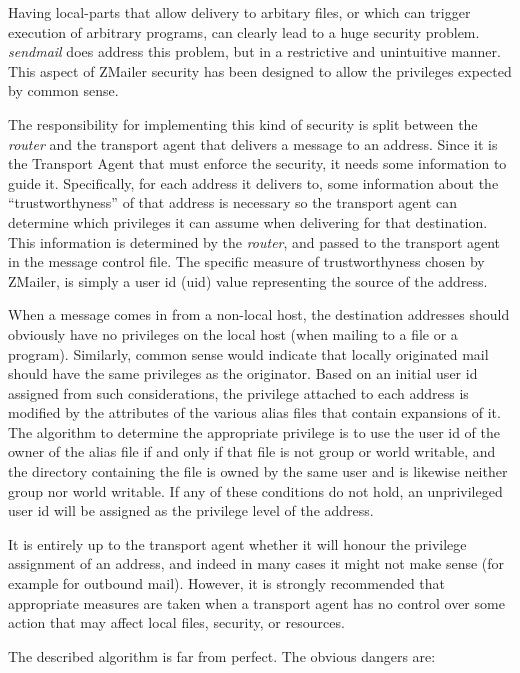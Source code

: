 Having local-parts that allow delivery to arbitary files, or which can trigger
execution of arbitrary programs, can clearly lead to a huge security
problem.  {\em sendmail\/} does address this problem, but in a restrictive and
unintuitive manner.  This aspect of ZMailer security has been designed to
allow the privileges expected by common sense.

The responsibility for implementing this kind of security is split between
the {\em router\/} and the transport agent that delivers a message to
an address.
Since it is the Transport Agent that must enforce the security, it needs
some information to guide it.  Specifically, for each address it delivers
to, some information about the ``trustworthyness'' of that address is
necessary so the transport agent can determine which privileges it can
assume when delivering for that destination.  This information is
determined by the {\em router\/}, and passed to the transport agent in the message
control file.  The specific measure of trustworthyness chosen by ZMailer, 
is simply a user id (uid) value representing the source of the address.

When a message comes in from a non-local host, the destination addresses
should obviously have no privileges on the local host (when mailing to a
file or a program).  Similarly, common sense would indicate that locally
originated mail should have the same privileges as the originator.  Based
on an initial user id assigned from such considerations, the privilege
attached to each address is modified by the attributes of the various alias
files that contain expansions of it.  The algorithm to determine the
appropriate privilege is to use the user id of the owner of the alias file
if and only if that file is not group or world writable, and the directory
containing the file is owned by the same user and is likewise neither group
nor world writable.  If any of these conditions do not hold, an
unprivileged user id will be assigned as the privilege level of the
address.



It is entirely up to the transport agent whether it will honour the
privilege assignment of an address, and indeed in many cases it might not
make sense (for example for outbound mail).  However, it is strongly
recommended that appropriate measures are taken when a transport agent has
no control over some action that may affect local files, security, or
resources.



The described algorithm is far from perfect. The obvious dangers are:

